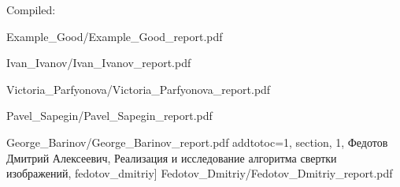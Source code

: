 \documentclass[a4paper]{article}
\begin{document}
Compiled: \DTMnow
\tableofcontents

\clearpage

{Example_Good/Example_Good_report.pdf}

{Ivan_Ivanov/Ivan_Ivanov_report.pdf}

{Victoria_Parfyonova/Victoria_Parfyonova_report.pdf}

{Pavel_Sapegin/Pavel_Sapegin_report.pdf}

{George_Barinov/George_Barinov_report.pdf}
    addtotoc={1, section, 1, {Федотов Дмитрий Алексеевич, Реализация и исследование алгоритма свертки изображений}, fedotov_dmitriy}]
{Fedotov_Dmitriy/Fedotov_Dmitriy_report.pdf}
\end{document}
